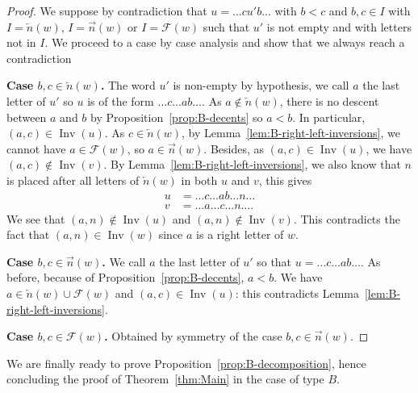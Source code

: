 \documentclass[ALCO,Unicode]{cedram}
\theoremstyle{definition}
\DeclareMathOperator{\invs}{Inv}
\newcommand{\R}{{\overrightarrow{n}}}
\newcommand{\LL}{{\overleftarrow{n}}}
\newcommand{\F}{\mathcal{F}}
\begin{document}
\begin{proof}
We suppose by contradiction that $u = \dots c u' b \dots$ with $b < c$ and $b,c \in I$ with  $I=\LL(w)$, $I=\R(w)$ or $I=\F(w)$ such that $u'$ is not empty and with letters not in $I$. We proceed to a case by case analysis and show that we always reach a contradiction



\textbf{Case $b,c \in \LL(w)$.}  The word $u'$ is non-empty by hypothesis, we call $a$ the last letter of $u'$ so $u$ is of the form $\dots c \dots a b \dots$. As $a \notin \LL(w)$, there is no descent between $a$ and $b$ by Proposition~\ref{prop:B-decents} so $a < b$. In particular, $(a,c) \in \invs(u)$. As $c \in \LL(w)$, by Lemma~\ref{lem:B-right-left-inversions}, we cannot have $a \in \F(w)$, so $a \in \R(w)$. Besides, as $(a,c) \in \invs(u)$, we have $(a,c) \not\in \invs(v)$. By Lemma~\ref{lem:B-right-left-inversions}, we also know that $n$ is placed after all letters of $\LL(w)$ in both $u$ and $v$, this gives
\begin{align*}
u &= \dots c \dots ab \dots n \dots \\
v &= \dots a \dots c \dots n \dots.
\end{align*}
We see that $(a,n) \not\in \invs(u)$ and $(a,n) \not\in \invs(v)$. This contradicts the fact that $(a,n)\in\invs(w)$ since $a$ is a right letter of $w$.



\textbf{Case $b,c \in \R(w)$.} We call $a$ the last letter of $u'$ so that $u = \dots c \dots ab \dots$. As before, because of Proposition~\ref{prop:B-decents}, $a<b$. We have $a \in \LL(w) \cup \F(w)$ and $(a,c) \in \invs(u)$: this contradicts Lemma~\ref{lem:B-right-left-inversions}.



\textbf{Case  $b,c \in \F(w)$.} Obtained by symmetry of the case $b,c \in \R(w)$. 
\end{proof}

We are finally ready to prove Proposition~\ref{prop:B-decomposition}, hence concluding the proof of Theorem~\ref{thm:Main} in the case of type $B$.
\end{document}
